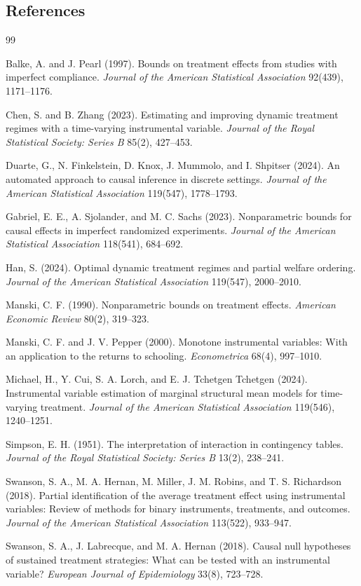 \documentclass[11pt]{article}
\theoremstyle{definition}
\theoremstyle{plain}
\theoremstyle{remark}
\begin{document}
\subsection*{References}
\begin{thebibliography}{99}

Balke, A. and J. Pearl (1997).
Bounds on treatment effects from studies with imperfect compliance.
\emph{Journal of the American Statistical Association} 92(439), 1171--1176.

Chen, S. and B. Zhang (2023).
Estimating and improving dynamic treatment regimes with a time-varying instrumental variable.
\emph{Journal of the Royal Statistical Society: Series B} 85(2), 427--453.

Duarte, G., N. Finkelstein, D. Knox, J. Mummolo, and I. Shpitser (2024).
An automated approach to causal inference in discrete settings.
\emph{Journal of the American Statistical Association} 119(547), 1778--1793.

Gabriel, E. E., A. Sjolander, and M. C. Sachs (2023).
Nonparametric bounds for causal effects in imperfect randomized experiments.
\emph{Journal of the American Statistical Association} 118(541), 684--692.

Han, S. (2024).
Optimal dynamic treatment regimes and partial welfare ordering.
\emph{Journal of the American Statistical Association} 119(547), 2000--2010.

Manski, C. F. (1990).
Nonparametric bounds on treatment effects.
\emph{American Economic Review} 80(2), 319--323.

Manski, C. F. and J. V. Pepper (2000).
Monotone instrumental variables: With an application to the returns to schooling.
\emph{Econometrica} 68(4), 997--1010.

Michael, H., Y. Cui, S. A. Lorch, and E. J. Tchetgen Tchetgen (2024).
Instrumental variable estimation of marginal structural mean models for time-varying treatment.
\emph{Journal of the American Statistical Association} 119(546), 1240--1251.

Simpson, E. H. (1951).
The interpretation of interaction in contingency tables.
\emph{Journal of the Royal Statistical Society: Series B} 13(2), 238--241.

Swanson, S. A., M. A. Hernan, M. Miller, J. M. Robins, and T. S. Richardson (2018).
Partial identification of the average treatment effect using instrumental variables: Review of methods for binary instruments, treatments, and outcomes.
\emph{Journal of the American Statistical Association} 113(522), 933--947.

Swanson, S. A., J. Labrecque, and M. A. Hernan (2018).
Causal null hypotheses of sustained treatment strategies: What can be tested with an instrumental variable?
\emph{European Journal of Epidemiology} 33(8), 723--728.

\end{thebibliography}
\end{document}
